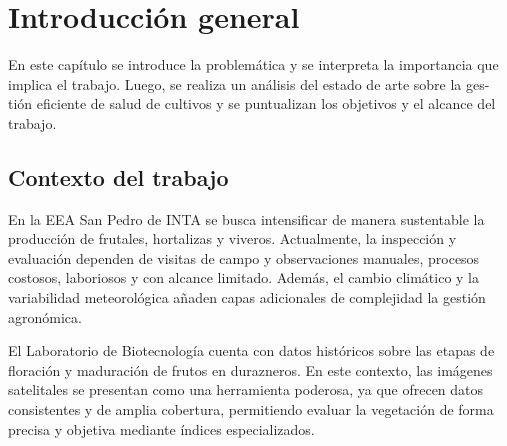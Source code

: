 
\chapter{Introducción general} %

\label{Chapter1} %
\label{IntroGeneral}

En este capítulo se introduce la problemática y se interpreta la importancia que
implica el trabajo. Luego, se realiza un análisis del estado de arte sobre la ges-
tión eficiente de salud de cultivos y se puntualizan los objetivos y el alcance del
trabajo.


\newcommand{\keyword}[1]{\textbf{#1}}
\newcommand{\tabhead}[1]{\textbf{#1}}
\newcommand{\code}[1]{\texttt{#1}}
\newcommand{\file}[1]{\texttt{\bfseries#1}}
\newcommand{\option}[1]{\texttt{\itshape#1}}
\newcommand{\grados}{$^{\circ}$}



\section{Contexto del trabajo}

En la EEA San Pedro de INTA se busca intensificar de manera sustentable la producción
de frutales, hortalizas y viveros. Actualmente, la inspección y evaluación
dependen de visitas de campo y observaciones manuales, procesos costosos, laboriosos
 y con alcance limitado. Además, el cambio climático y la variabilidad
meteorológica añaden capas adicionales de complejidad la gestión agronómica.

El Laboratorio de Biotecnología cuenta con datos históricos sobre las etapas de
floración y maduración de frutos en durazneros. En este contexto, las imágenes
satelitales se presentan como una herramienta poderosa, ya que ofrecen datos
consistentes y de amplia cobertura, permitiendo evaluar la vegetación de forma
precisa y objetiva mediante índices especializados.


